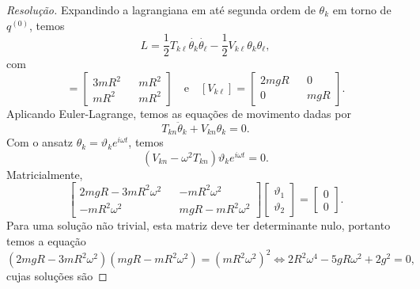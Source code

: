 \begin{proof}[Resolução]
    Expandindo a lagrangiana em até segunda ordem de \(\theta_k\) em torno de \(q^{(0)}\), temos
    \begin{equation*}
        L = \frac12T_{k\ell} \dot{\theta_k} \dot{\theta_\ell} - \frac12 V_{k\ell} \theta_k \theta_\ell,
    \end{equation*}
    com
    \begin{equation*}
        [T_{k\ell}] = \begin{bmatrix}
            3mR^2 && mR^2\\
            mR^2 && mR^2
        \end{bmatrix}
        \quad\text{e}\quad[V_{k\ell}] = \begin{bmatrix}
            2mgR && 0\\
            0 && mgR
        \end{bmatrix}.
    \end{equation*}
    Aplicando Euler-Lagrange, temos as equações de movimento dadas por
    \begin{equation*}
        T_{k n} \ddot{\theta}_k + V_{k n} \theta_k = 0.
    \end{equation*}
    Com o ansatz \(\theta_k = \vartheta_k e^{i\omega t}\), temos
    \begin{equation*}
        \left(V_{kn}-\omega^2T_{kn}\right)\vartheta_k e^{i\omega t} = 0.
    \end{equation*}
    Matricialmente,
    \begin{equation*}
        \begin{bmatrix}
            2mgR-3mR^2\omega^2 && - mR^2 \omega^2\\
            -mR^2\omega^2 && mgR - mR^2 \omega^2
        \end{bmatrix}
        \begin{bmatrix}
            \vartheta_1\\\vartheta_2
        \end{bmatrix}
        =
        \begin{bmatrix}
            0\\0
        \end{bmatrix}.
    \end{equation*}
    Para uma solução não trivial, esta matriz deve ter determinante nulo, portanto temos a equação
    \begin{equation*}
        (2mgR - 3mR^2\omega^2)(mgR - mR^2\omega^2) = (mR^2\omega^2)^2 \iff 2R^2\omega^4 - 5gR\omega^2 + 2g^2 = 0,
    \end{equation*}
    cujas soluções são

\end{proof}
